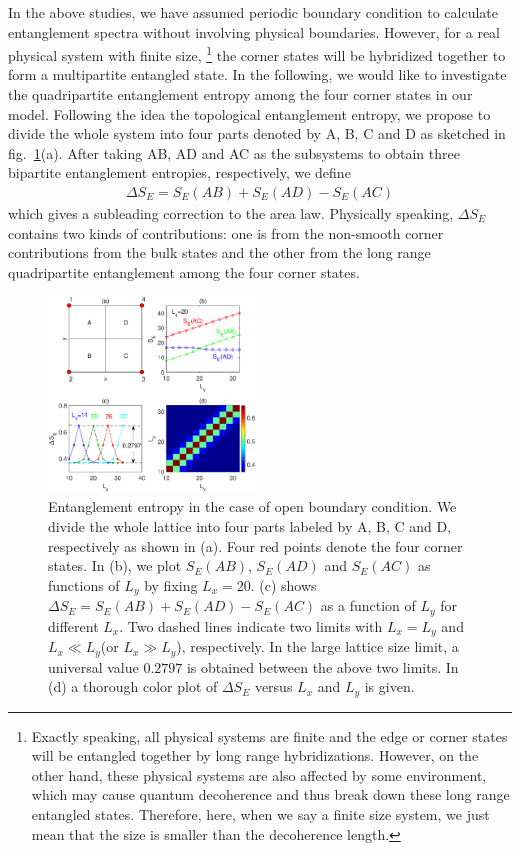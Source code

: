 \documentclass[doublecol]{epl2} %
\begin{document}
In the above studies, we have assumed  periodic boundary condition to calculate entanglement spectra without involving physical boundaries. However, for a real physical system with finite size, \footnote{Exactly speaking, all physical systems are finite and the edge or corner states will be entangled together by long range hybridizations. However, on the other hand, these physical systems are also affected by some environment, which may cause quantum decoherence and thus break down these long range entangled states. Therefore, here, when we say a finite size system, we just mean that the size is smaller than the decoherence length.} the corner states will be hybridized together to form a multipartite entangled state. In the following, we would like to investigate the quadripartite entanglement entropy among the four corner states in our model. Following the idea  the topological entanglement entropy, \cite{Kitaev_PRL_2006, Levin_PRL_2006} we propose to divide the whole system into four parts denoted by A, B, C and D as sketched in fig.~\ref{fig:quadripartite}(a). After taking AB, AD and AC as the subsystems to obtain three bipartite entanglement entropies, respectively, we define
\begin{eqnarray}
\Delta S_E=S_E(AB)+S_E(AD)-S_E(AC)
\end{eqnarray}
which gives a subleading correction to the area law. Physically speaking, $\Delta S_E$ contains two kinds of contributions: one is from the non-smooth corner contributions from the bulk states and the other from the long range quadripartite entanglement among the four corner states.

\begin{figure}
	\includegraphics[width=0.49\textwidth]{quadripartite.eps}
	\caption{\label{fig:quadripartite} Entanglement entropy in the case of open boundary condition. We divide the whole lattice into four parts labeled by A, B, C and D, respectively as shown in (a). Four red points denote the four corner states. In (b), we plot $S_E(AB)$, $S_E(AD)$ and $S_E(AC)$ as functions of $L_y$ by fixing $L_x=20$. (c) shows $\Delta S_E=S_E(AB)+S_E(AD)-S_E(AC)$ as a function of $L_y$ for different $L_x$. Two dashed lines indicate two limits with $L_x=L_y$ and $L_x\ll L_y$(or $L_x\gg L_y$), respectively. In the large lattice size limit, a universal value $0.2797$ is obtained between the above two limits. In (d) a thorough color plot of $\Delta S_E$ versus $L_x$ and $L_y$ is given.}
\end{figure}
\end{document}

